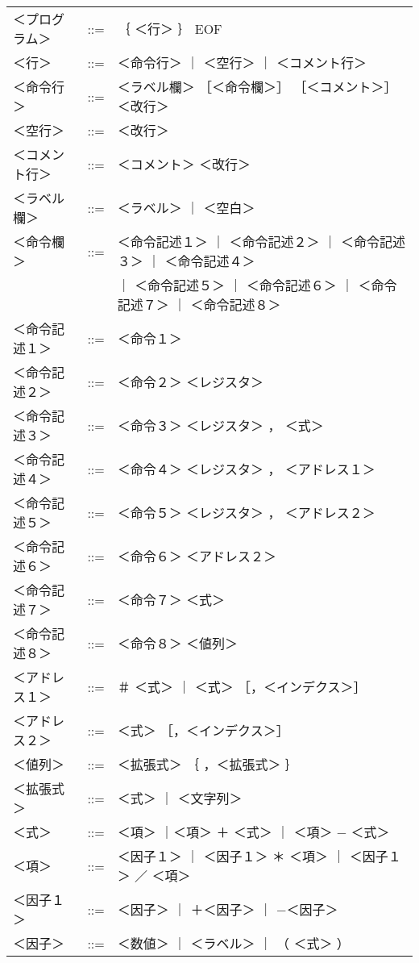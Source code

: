 \onecolumn

\begin{center}
{\small\tt\begin{tabular}{lll}
＜プログラム＞& ::= &｛ ＜行＞ ｝ EOF \\
＜行＞        & ::= &＜命令行＞ ｜ ＜空行＞ ｜ ＜コメント行＞ \\
＜命令行＞    & ::= &＜ラベル欄＞ ［＜命令欄＞］ ［＜コメント＞］ ＜改行＞ \\
＜空行＞      & ::= &＜改行＞ \\
＜コメント行＞& ::= &＜コメント＞ ＜改行＞ \\
＜ラベル欄＞  & ::= &＜ラベル＞ ｜ ＜空白＞ \\
＜命令欄＞    & ::= &＜命令記述１＞ ｜ ＜命令記述２＞ ｜ ＜命令記述３＞
                       ｜ ＜命令記述４＞ \\
              &     &  ｜ ＜命令記述５＞ ｜ ＜命令記述６＞ 
                       ｜ ＜命令記述７＞ ｜ ＜命令記述８＞ \\
＜命令記述１＞& ::= &＜命令１＞ \\
＜命令記述２＞& ::= &＜命令２＞ ＜レジスタ＞ \\
＜命令記述３＞& ::= &＜命令３＞ ＜レジスタ＞ ， ＜式＞ \\
＜命令記述４＞& ::= &＜命令４＞ ＜レジスタ＞ ， ＜アドレス１＞ \\
＜命令記述５＞& ::= &＜命令５＞ ＜レジスタ＞ ， ＜アドレス２＞ \\
＜命令記述６＞& ::= &＜命令６＞ ＜アドレス２＞ \\
＜命令記述７＞& ::= &＜命令７＞ ＜式＞ \\
＜命令記述８＞& ::= &＜命令８＞ ＜値列＞ \\
＜アドレス１＞& ::= &＃ ＜式＞ ｜ ＜式＞ ［，＜インデクス＞］ \\
＜アドレス２＞& ::= &＜式＞ ［，＜インデクス＞］ \\
＜値列＞      & ::= &＜拡張式＞ ｛ ，＜拡張式＞ ｝ \\
＜拡張式＞    & ::= &＜式＞ ｜ ＜文字列＞ \\
＜式＞        & ::= &＜項＞ ｜＜項＞ ＋ ＜式＞ ｜ ＜項＞ − ＜式＞ \\
＜項＞     & ::= &＜因子１＞ ｜ ＜因子１＞ ＊ ＜項＞ ｜ ＜因子１＞ ／ ＜項＞ \\
＜因子１＞    & ::= &＜因子＞ ｜ ＋＜因子＞ ｜ −＜因子＞ \\
＜因子＞      & ::= &＜数値＞ ｜ ＜ラベル＞ ｜ （ ＜式＞ ） \\

\end{tabular}}
\end{center}
